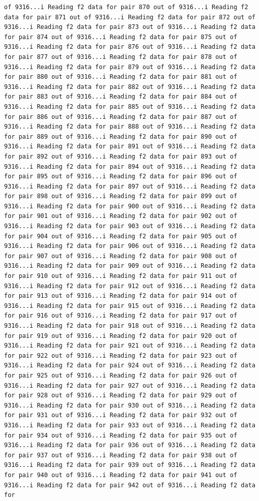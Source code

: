 \documentclass[
]{article}
\begin{document}
\begin{verbatim}
of 9316...i Reading f2 data for pair 870 out of 9316...i Reading f2 data for pair 871 out of 9316...i Reading f2 data for pair 872 out of 9316...i Reading f2 data for pair 873 out of 9316...i Reading f2 data for pair 874 out of 9316...i Reading f2 data for pair 875 out of 9316...i Reading f2 data for pair 876 out of 9316...i Reading f2 data for pair 877 out of 9316...i Reading f2 data for pair 878 out of 9316...i Reading f2 data for pair 879 out of 9316...i Reading f2 data for pair 880 out of 9316...i Reading f2 data for pair 881 out of 9316...i Reading f2 data for pair 882 out of 9316...i Reading f2 data for pair 883 out of 9316...i Reading f2 data for pair 884 out of 9316...i Reading f2 data for pair 885 out of 9316...i Reading f2 data for pair 886 out of 9316...i Reading f2 data for pair 887 out of 9316...i Reading f2 data for pair 888 out of 9316...i Reading f2 data for pair 889 out of 9316...i Reading f2 data for pair 890 out of 9316...i Reading f2 data for pair 891 out of 9316...i Reading f2 data for pair 892 out of 9316...i Reading f2 data for pair 893 out of 9316...i Reading f2 data for pair 894 out of 9316...i Reading f2 data for pair 895 out of 9316...i Reading f2 data for pair 896 out of 9316...i Reading f2 data for pair 897 out of 9316...i Reading f2 data for pair 898 out of 9316...i Reading f2 data for pair 899 out of 9316...i Reading f2 data for pair 900 out of 9316...i Reading f2 data for pair 901 out of 9316...i Reading f2 data for pair 902 out of 9316...i Reading f2 data for pair 903 out of 9316...i Reading f2 data for pair 904 out of 9316...i Reading f2 data for pair 905 out of 9316...i Reading f2 data for pair 906 out of 9316...i Reading f2 data for pair 907 out of 9316...i Reading f2 data for pair 908 out of 9316...i Reading f2 data for pair 909 out of 9316...i Reading f2 data for pair 910 out of 9316...i Reading f2 data for pair 911 out of 9316...i Reading f2 data for pair 912 out of 9316...i Reading f2 data for pair 913 out of 9316...i Reading f2 data for pair 914 out of 9316...i Reading f2 data for pair 915 out of 9316...i Reading f2 data for pair 916 out of 9316...i Reading f2 data for pair 917 out of 9316...i Reading f2 data for pair 918 out of 9316...i Reading f2 data for pair 919 out of 9316...i Reading f2 data for pair 920 out of 9316...i Reading f2 data for pair 921 out of 9316...i Reading f2 data for pair 922 out of 9316...i Reading f2 data for pair 923 out of 9316...i Reading f2 data for pair 924 out of 9316...i Reading f2 data for pair 925 out of 9316...i Reading f2 data for pair 926 out of 9316...i Reading f2 data for pair 927 out of 9316...i Reading f2 data for pair 928 out of 9316...i Reading f2 data for pair 929 out of 9316...i Reading f2 data for pair 930 out of 9316...i Reading f2 data for pair 931 out of 9316...i Reading f2 data for pair 932 out of 9316...i Reading f2 data for pair 933 out of 9316...i Reading f2 data for pair 934 out of 9316...i Reading f2 data for pair 935 out of 9316...i Reading f2 data for pair 936 out of 9316...i Reading f2 data for pair 937 out of 9316...i Reading f2 data for pair 938 out of 9316...i Reading f2 data for pair 939 out of 9316...i Reading f2 data for pair 940 out of 9316...i Reading f2 data for pair 941 out of 9316...i Reading f2 data for pair 942 out of 9316...i Reading f2 data for 
\end{verbatim}
\end{document}
